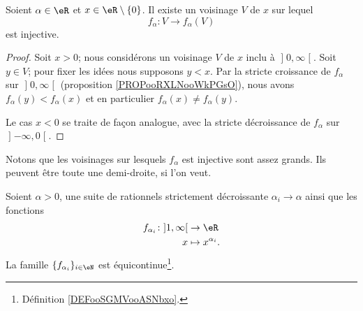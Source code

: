 \begin{proposition}     \label{PROPooHKTKooCUEBjh}
    Soient \( \alpha\in \eR\) et \( x\in \eR\setminus\{ 0 \}\). Il existe un voisinage \( V\) de \( x\) sur lequel
    \begin{equation}
            f_{\alpha}\colon V \to f_{\alpha}(V) 
    \end{equation}
    est injective.
\end{proposition}

\begin{proof}
Soit \( x>0 \); nous considérons un voisinage \( V\) de \( x\) inclu à \( \mathopen] 0 , \infty \mathclose[\). Soit \( y\in V\); pour fixer les idées nous supposons \( y<x\). Par la stricte croissance de \( f_{\alpha}\) sur \( \mathopen] 0 , \infty \mathclose[\) (proposition \ref{PROPooRXLNooWkPGsO}), nous avons \( f_{\alpha}(y)<f_{\alpha}(x)\) et en particulier \( f_{\alpha}(x)\neq f_{\alpha}(y)\).

Le cas \( x<0\) se traite de façon analogue, avec la stricte décroissance de \( f_{\alpha}\) sur \( \mathopen] -\infty , 0 \mathclose[\).
\end{proof}
Notons que les voisinages sur lesquels \( f_{\alpha}\) est injective sont assez grands. Ils peuvent être toute une demi-droite, si l'on veut.

\begin{lemma}   \label{LEMooQTNKooLVEytN}
    Soient \( \alpha>0\), une suite de rationnels strictement décroissante \( \alpha_i\to \alpha\) ainsi que les fonctions
    \begin{equation}
        \begin{aligned}
        f_{\alpha_i}\colon \mathopen] 1 , \infty \mathclose[&\to \eR \\
            x&\mapsto x^{\alpha_i}. 
        \end{aligned}
    \end{equation}
    La famille \( \{ f_{\alpha_i} \}_{i\in \eN}\) est équicontinue\footnote{Définition \ref{DEFooSGMVooASNbxo}.}.
\end{lemma}

